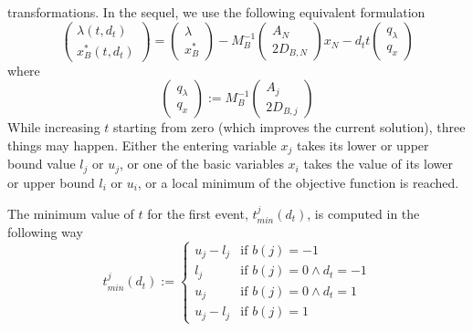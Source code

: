 \documentclass[a4paper]{article}
\begin{document}
transformations. In the sequel, we use the following equivalent formulation
\begin{equation}
\label{eq:Ratio_Test_1_Opt_sol_t}
\left(
\begin{array}{c}
\lambda(t, d_{t}) \\
\hline
x_{B}^{*}(t, d_{t})
\end{array}
\right)
=
\left(
\begin{array}{c}
\lambda \\
\hline
x_{B}^{*}
\end{array}
\right)
-
M_{B}^{-1}
\left(
\begin{array}{c}
A_{N} \\
\hline
2D_{B,N}
\end{array}
\right)
x_{N}
-
d_{t}t
\left(
\begin{array}{c}
q_{\lambda} \\
\hline
q_{x}
\end{array}
\right)
\end{equation}
where
\begin{equation}
\left(
\begin{array}{c}
q_{\lambda} \\
\hline
q_{x}
\end{array}
\right)
:=
M_{B}^{-1}
\left(
\begin{array}{c}
A_{j} \\
\hline
2D_{B,j}
\end{array}
\right)
\end{equation}
While increasing $t$ starting from zero (which improves the current solution),
three things may happen. Either the entering variable $x_{j}$ takes its lower or
upper bound value $l_{j}$ or $u_{j}$, or one of the basic variables $x_{i}$
takes the value of its lower or upper bound $l_{i}$ or $u_{i}$, or a local
minimum of the objective function is reached.

The minimum value of $t$ for the first event, $t_{min}^{j}(d_{t})$, is computed
in the following way
\begin{equation}
t_{min}^{j}(d_{t}):=
\left\{
\begin{array}{ll}
u_{j}-l_{j}
&
\text{if $b(j)=-1$} \\
l_{j}
&
\text{if $b(j)=0 \wedge d_{t}=-1$} \\
u_{j}
&
\text{if $b(j)=0 \wedge d_{t}=1$} \\
u_{j}-l_{j}
&
\text{if $b(j)=1$}
\end{array}
\right.
\end{equation}
\end{document}
